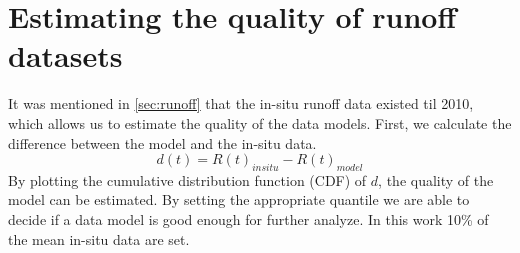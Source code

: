 \section{Estimating the quality of runoff datasets}\label{sec:runoffdata}
It was mentioned in \autoref{sec:runoff} that the in-situ runoff data existed til 2010, which allows us to estimate the quality of the data models. First, we calculate the difference between the model and the in-situ data.
\begin{equation}
	d(t) = R(t)_{insitu} - R(t)_{model}
\end{equation}
By plotting the cumulative distribution function (CDF) of $d$, the quality of the model can be estimated. By setting the appropriate quantile we are able to decide if a data model is good enough for further analyze. In this work 10\% of the mean in-situ data are set.  
